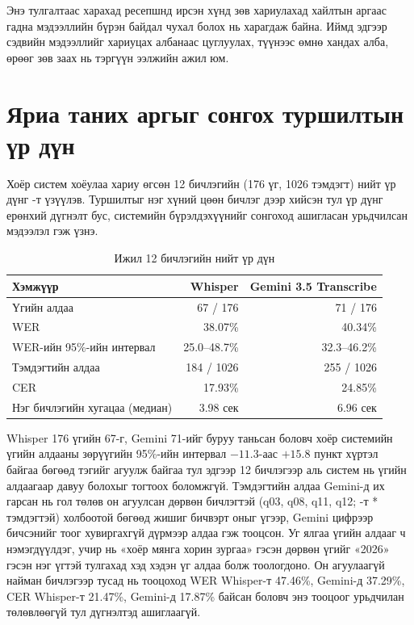 Энэ тулгалтаас харахад ресепшнд ирсэн хүнд зөв хариулахад хайлтын аргаас гадна мэдээллийн бүрэн байдал чухал болох нь харагдаж байна. Иймд эдгээр сэдвийн мэдээллийг хариуцах албанаас цуглуулах, түүнээс өмнө хандах алба, өрөөг зөв заах нь тэргүүн ээлжийн ажил юм.


\section{Яриа таних аргыг сонгох туршилтын үр дүн}
\label{sec:res-stt-all}
\label{sec:res-stt}

Хоёр систем хоёулаа хариу өгсөн 12 бичлэгийн (176 үг, 1026 тэмдэгт) нийт үр дүнг -т үзүүлэв. Туршилтыг нэг хүний цөөн бичлэг дээр хийсэн тул үр дүнг ерөнхий дүгнэлт бус, системийн бүрэлдэхүүнийг сонгоход ашигласан урьдчилсан мэдээлэл гэж үзнэ.

\begin{table}[htbp]
\centering
\caption{Ижил 12 бичлэгийн нийт үр дүн}
\label{tab:stt_results}
\begin{tabular}{|l|r|r|}
\hline
\textbf{Хэмжүүр} & \textbf{Whisper} & \textbf{Gemini 3.5 Transcribe} \\
\hline
Үгийн алдаа & 67 / 176 & 71 / 176 \\
\acs{WER} & 38.07\% & 40.34\% \\
\acs{WER}-ийн 95\%-ийн интервал & 25.0--48.7\% & 32.3--46.2\% \\
\hline
Тэмдэгтийн алдаа & 184 / 1026 & 255 / 1026 \\
\acs{CER} & 17.93\% & 24.85\% \\
\hline
Нэг бичлэгийн хугацаа (медиан) & 3.98 сек & 6.96 сек \\
\hline
\end{tabular}
\end{table}

Whisper 176 үгийн 67-г, Gemini 71-ийг буруу таньсан боловч хоёр системийн үгийн алдааны зөрүүгийн 95\%-ийн интервал $-11.3$-аас $+15.8$ пункт хүртэл байгаа бөгөөд тэгийг агуулж байгаа тул эдгээр 12 бичлэгээр аль систем нь үгийн алдаагаар давуу болохыг тогтоох боломжгүй. Тэмдэгтийн алдаа Gemini-д их гарсан нь гол төлөв он агуулсан дөрвөн бичлэгтэй (q03, q08, q11, q12; -т * тэмдэгтэй) холбоотой бөгөөд жишиг бичвэрт оныг үгээр, Gemini цифрээр бичсэнийг тоог хувиргахгүй дүрмээр алдаа гэж тооцсон. Уг ялгаа үгийн алдааг ч нэмэгдүүлдэг, учир нь «хоёр мянга хорин зургаа» гэсэн дөрвөн үгийг «2026» гэсэн нэг үгтэй тулгахад хэд хэдэн үг алдаа болж тоологдоно. Он агуулаагүй найман бичлэгээр тусад нь тооцоход \acs{WER} Whisper-т 47.46\%, Gemini-д 37.29\%, \acs{CER} Whisper-т 21.47\%, Gemini-д 17.87\% байсан боловч энэ тооцоог урьдчилан төлөвлөөгүй тул дүгнэлтэд ашиглаагүй.

